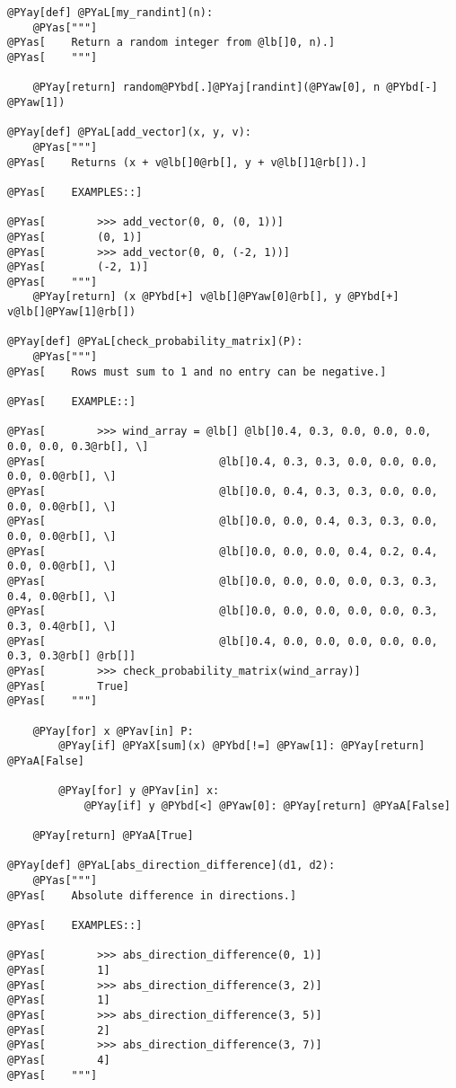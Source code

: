 \begin{Verbatim}[commandchars=@\[\]]
@PYay[def] @PYaL[my_randint](n):
    @PYas["""]
@PYas[    Return a random integer from @lb[]0, n).]
@PYas[    """]

    @PYay[return] random@PYbd[.]@PYaj[randint](@PYaw[0], n @PYbd[-] @PYaw[1])

@PYay[def] @PYaL[add_vector](x, y, v):
    @PYas["""]
@PYas[    Returns (x + v@lb[]0@rb[], y + v@lb[]1@rb[]).]

@PYas[    EXAMPLES::]

@PYas[        >>> add_vector(0, 0, (0, 1))]
@PYas[        (0, 1)]
@PYas[        >>> add_vector(0, 0, (-2, 1))]
@PYas[        (-2, 1)]
@PYas[    """]
    @PYay[return] (x @PYbd[+] v@lb[]@PYaw[0]@rb[], y @PYbd[+] v@lb[]@PYaw[1]@rb[])

@PYay[def] @PYaL[check_probability_matrix](P):
    @PYas["""]
@PYas[    Rows must sum to 1 and no entry can be negative.]

@PYas[    EXAMPLE::]

@PYas[        >>> wind_array = @lb[] @lb[]0.4, 0.3, 0.0, 0.0, 0.0, 0.0, 0.0, 0.3@rb[], \]
@PYas[                           @lb[]0.4, 0.3, 0.3, 0.0, 0.0, 0.0, 0.0, 0.0@rb[], \]
@PYas[                           @lb[]0.0, 0.4, 0.3, 0.3, 0.0, 0.0, 0.0, 0.0@rb[], \]
@PYas[                           @lb[]0.0, 0.0, 0.4, 0.3, 0.3, 0.0, 0.0, 0.0@rb[], \]
@PYas[                           @lb[]0.0, 0.0, 0.0, 0.4, 0.2, 0.4, 0.0, 0.0@rb[], \]
@PYas[                           @lb[]0.0, 0.0, 0.0, 0.0, 0.3, 0.3, 0.4, 0.0@rb[], \]
@PYas[                           @lb[]0.0, 0.0, 0.0, 0.0, 0.0, 0.3, 0.3, 0.4@rb[], \]
@PYas[                           @lb[]0.4, 0.0, 0.0, 0.0, 0.0, 0.0, 0.3, 0.3@rb[] @rb[]]
@PYas[        >>> check_probability_matrix(wind_array)]
@PYas[        True]
@PYas[    """]

    @PYay[for] x @PYav[in] P:
        @PYay[if] @PYaX[sum](x) @PYbd[!=] @PYaw[1]: @PYay[return] @PYaA[False]

        @PYay[for] y @PYav[in] x:
            @PYay[if] y @PYbd[<] @PYaw[0]: @PYay[return] @PYaA[False]

    @PYay[return] @PYaA[True]

@PYay[def] @PYaL[abs_direction_difference](d1, d2):
    @PYas["""]
@PYas[    Absolute difference in directions.]

@PYas[    EXAMPLES::]

@PYas[        >>> abs_direction_difference(0, 1)]
@PYas[        1]
@PYas[        >>> abs_direction_difference(3, 2)]
@PYas[        1]
@PYas[        >>> abs_direction_difference(3, 5)]
@PYas[        2]
@PYas[        >>> abs_direction_difference(3, 7)]
@PYas[        4]
@PYas[    """]


\end{Verbatim}
